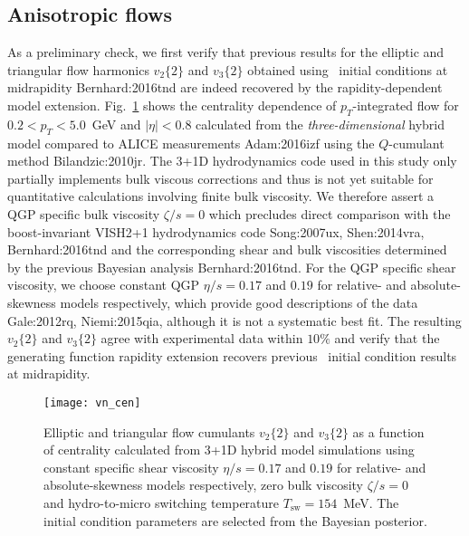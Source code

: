 \subsection{Anisotropic flows} 
As a preliminary check, we first verify that previous results for the elliptic and triangular flow harmonics $v_2\{2\}$ and $v_3\{2\}$ obtained using \trento\ initial conditions at midrapidity {Bernhard:2016tnd} are indeed recovered by the rapidity-dependent model extension.
Fig.~\ref{fig:vn_cen} shows the centrality dependence of $p_T$-integrated flow for ${0.2  < p_T < 5.0}$~GeV and $|\eta| < 0.8$ calculated from the \emph{three-dimensional} hybrid model compared to \mbox{ALICE} measurements {Adam:2016izf} using the  $Q$-cumulant method {Bilandzic:2010jr}.
The 3+1D hydrodynamics code used in this study only partially implements bulk viscous corrections and thus is not yet suitable for quantitative calculations involving finite bulk viscosity.
We therefore assert a QGP specific bulk viscosity $\zeta/s = 0$ which precludes direct comparison with the boost-invariant VISH2+1 hydrodynamics code {Song:2007ux, Shen:2014vra, Bernhard:2016tnd} and the corresponding shear and bulk viscosities determined by the previous Bayesian analysis {Bernhard:2016tnd}.
For the QGP specific shear viscosity, we choose constant QGP $\eta/s = 0.17$ and $0.19$ for relative- and absolute-skewness models respectively, which provide good descriptions of the data {Gale:2012rq, Niemi:2015qia}, although it is not a systematic best fit.
The resulting $v_2\{2\}$ and $v_3\{2\}$ agree with experimental data within $10\%$ and verify that the generating function rapidity extension recovers previous \trento\ initial condition results at midrapidity.

\begin{figure}
  \texttt{[image: vn\_cen]}
  \caption{Elliptic and triangular flow cumulants $v_2\{2\}$ and $v_3\{2\}$ as a function of centrality calculated from 3+1D hybrid model simulations using constant specific shear viscosity $\eta/s=0.17$ and $0.19$ for relative- and absolute-skewness models respectively, zero bulk viscosity $\zeta/s=0$ and hydro-to-micro switching temperature $T_\text{sw}=154$~MeV.
  The initial condition parameters are selected from the Bayesian posterior.}
  \label{fig:vn_cen}
\end{figure}

